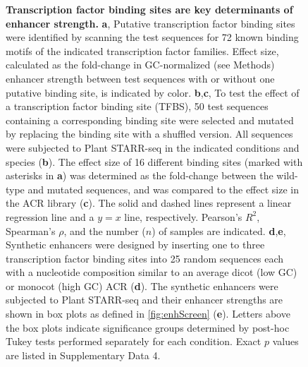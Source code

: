 \documentclass[10pt]{article}
\newcommand{\fignormal}{\scriptsize} %
\newif\ifnpc
\newcounter{fig}
\newenvironment{fig}{%
	\begin{figure}[p]%
		\stepcounter{fig}%
		\pdfbookmark{\figurename\ \thefig}{figure\thefig}
		\tikzsetnextfilename{figure\thefig}%
		\fignormal%
		\centering%
}{%
	\end{figure}%
	\clearpage%
	\ifnpc%
		\makenextpagecaption%
		\global\npcfalse%
	\fi%
}
\newcounter{efig}
\newcommand{\titleend}{ }
\newcommand{\nextentry}{ }
\newcommand{\captiontitle}[2][]{\textbf{#2.}\titleend}
\newif\ifsubfigupper
\newcounter{subfig}[figure]
\newcommand{\subfigrefsep}{,}
\newcommand{\subfigrefand}{,}
\newcommand{\subfigunformatted}[1]{\ifsubfigupper\uppercase{#1}\else\lowercase{#1}\fi}
\newcommand{\plainsubfigref}[1]{\textbf{\subfigunformatted{#1}}}
\newcommand{\subfig}[1]{\plainsubfigref{#1}\subfigrefsep}
\newcommand{\subfigtwo}[2]{\plainsubfigref{#1}\subfigrefand\plainsubfigref{#2}\subfigrefsep}
\newcommand{\parensubfig}[2][]{(#1\plainsubfigref{#2})}
\begin{document}
		\begin{fig}
			\caption{%
				\captiontitle{Transcription factor binding sites are key determinants of enhancer strength}%
				\subfig{A} Putative transcription factor binding sites were identified by scanning the test sequences for 72 known binding motifs of the indicated transcription factor families. Effect size, calculated as the fold-change in GC-normalized (see Methods) enhancer strength between test sequences with or without one putative binding site, is indicated by color.\nextentry
				\subfigtwo{B}{C} To test the effect of a transcription factor binding site (TFBS), 50 test sequences containing a corresponding binding site were selected and mutated by replacing the binding site with a shuffled version. All sequences were subjected to Plant STARR-seq in the indicated conditions and species \parensubfig{B}. The effect size of 16 different binding sites (marked with asterisks in \plainsubfigref{A}) was determined as the fold-change between the wild-type and mutated sequences, and was compared to the effect size in the ACR library \parensubfig{C}. The solid and dashed lines represent a linear regression line and a $y = x$ line, respectively. Pearson's $R^2$, Spearman's $\rho$, and the number ($n$) of samples are indicated.
				\subfigtwo{D}{E} Synthetic enhancers were designed by inserting one to three transcription factor binding sites into 25 random sequences each with a nucleotide composition similar to an average dicot (low GC) or monocot (high GC) ACR \parensubfig{D}. The synthetic enhancers were subjected to Plant STARR-seq and their enhancer strengths are shown in box plots as defined in \cref{fig:enhScreen} \parensubfig{E}. Letters above the box plots indicate significance groups determined by post-hoc Tukey tests performed separately for each condition. Exact $p$ values are listed in Supplementary Data 4.%
			}%
			\label{fig:TFBS}%
		\end{fig}
		
\end{document}
